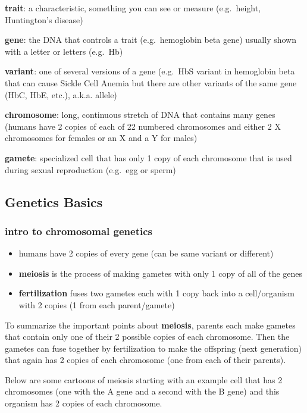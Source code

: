 \documentclass[]{book}
\providecommand{\tightlist}{%
  \setlength{\itemsep}{0pt}\setlength{\parskip}{0pt}}
\theoremstyle{definition}
\theoremstyle{definition}
\theoremstyle{definition}
\theoremstyle{remark}
\begin{document}
\textbf{trait}: a characteristic, something you can see or measure
(e.g.~height, Huntington's disease)

\textbf{gene}: the DNA that controls a trait (e.g.~hemoglobin beta gene)
usually shown with a letter or letters (e.g.~Hb)

\textbf{variant}: one of several versions of a gene (e.g.~HbS variant in
hemoglobin beta that can cause Sickle Cell Anemia but there are other
variants of the same gene (HbC, HbE, etc.), a.k.a. allele)

\textbf{chromosome}: long, continuous stretch of DNA that contains many
genes (humans have 2 copies of each of 22 numbered chromosomes and
either 2 X chromosomes for females or an X and a Y for males)

\textbf{gamete}: specialized cell that has only 1 copy of each
chromosome that is used during sexual reproduction (e.g.~egg or sperm)

\subsection{Genetics Basics}\label{genetics-basics}

\subsubsection{intro to chromosomal
genetics}\label{intro-to-chromosomal-genetics}

\begin{itemize}
\tightlist
\item
  humans have 2 copies of every gene (can be same variant or different)
\item
  \textbf{meiosis} is the process of making gametes with only 1 copy of
  all of the genes
\item
  \textbf{fertilization} fuses two gametes each with 1 copy back into a
  cell/organism with 2 copies (1 from each parent/gamete)
\end{itemize}

To summarize the important points about \textbf{meiosis}, parents each
make gametes that contain only one of their 2 possible copies of each
chromosome. Then the gametes can fuse together by fertilization to make
the offspring (next generation) that again has 2 copies of each
chromosome (one from each of their parents).

Below are some cartoons of meiosis starting with an example cell that
has 2 chromosomes (one with the A gene and a second with the B gene) and
this organism has 2 copies of each chromosome.
\end{document}
